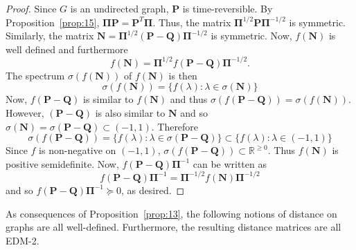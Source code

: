\begin{proof}
  Since $G$ is an undirected graph, $\mathbf{P}$ is time-reversible. By
  Proposition~\ref{prop:15}, $\bm{\Pi}\mathbf{P} =
  \mathbf{P}^{T}\bm{\Pi}$. Thus, the matrix
  $\bm{\Pi}^{1/2}\mathbf{P}\bm{\Pi}^{-1/2}$ is
  symmetric. Similarly, the matrix $\mathbf{N} =
  \bm{\Pi}^{1/2}(\mathbf{P} - \mathbf{Q})\bm{\Pi}^{-1/2}$ is
  symmetric. Now, $f(\mathbf{N})$ is well defined and furthermore
  \begin{equation}
    \label{eq:66}
    f(\mathbf{N}) = \bm{\Pi}^{1/2}f(\mathbf{P} -
    \mathbf{Q})\bm{\Pi}^{-1/2}.
  \end{equation}
  The spectrum $\sigma(f(\mathbf{N}))$ of $f(\mathbf{N})$ is then
  \begin{equation}
    \label{eq:67}
    \sigma(f(\mathbf{N})) = \{ f(\lambda) \colon \lambda \in
    \sigma(\mathbf{N}) \}
  \end{equation}
  Now, $f(\mathbf{P} - \mathbf{Q})$ is similar to $f(\mathbf{N})$ and
  thus $\sigma(f(\mathbf{P} - \mathbf{Q})) =
  \sigma(f(\mathbf{N}))$. However, $(\mathbf{P} - \mathbf{Q})$ is also
  similar to $\mathbf{N}$ and so $\sigma(\mathbf{N}) =
  \sigma(\mathbf{P} - \mathbf{Q}) \subset
  (-1,1)$. Therefore 
  \begin{equation}
    \label{eq:68}
    \sigma(f(\mathbf{P} - \mathbf{Q})) = \{ f(\lambda) \colon \lambda \in
    \sigma(\mathbf{P} - \mathbf{Q})\} \subset \{ f(\lambda) \colon
    \lambda \in (-1,1) \}
  \end{equation}
  Since $f$ is non-negative on $(-1,1)$, $\sigma(f(\mathbf{P} -
  \mathbf{Q})) \subset \mathbb{R}^{\geq 0}$. Thus $f(\mathbf{N})$ is
  positive semidefinite. Now, $f(\mathbf{P} -
  \mathbf{Q})\bm{\Pi}^{-1}$ can be written as
  \begin{equation}
    \label{eq:69}
f(\mathbf{P} - \mathbf{Q})\bm{\Pi}^{-1} = \bm{\Pi}^{-1/2}
f(\mathbf{N}) \bm{\Pi}^{-1/2}
  \end{equation}
and so $f(\mathbf{P} - \mathbf{Q})\bm{\Pi}^{-1} \succeq
0$, as desired. 
\end{proof}
As consequences of Proposition~\ref{prop:13}, the following notions of
distance on graphs are all well-defined. Furthermore, the resulting
distance matrices are all EDM-2.
